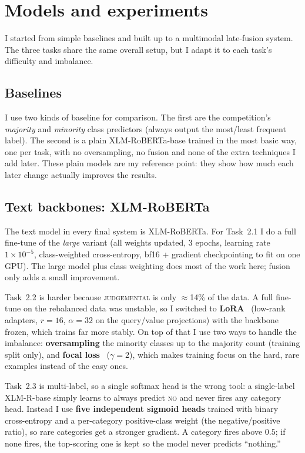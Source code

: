 \documentclass[11pt,a4paper]{article}
\begin{document}
\section{Models and experiments}
I started from simple baselines and built up to a multimodal late-fusion system. The three tasks
share the same overall setup, but I adapt it to each task's difficulty and imbalance.

\subsection{Baselines}
I use two kinds of baseline for comparison. The first are the competition's \emph{majority} and
\emph{minority} class predictors (always output the most/least frequent label). The second is a
plain XLM-RoBERTa-base trained in the most basic way, one per task, with no oversampling,
no fusion and none of the extra techniques I add later. These plain models are my reference point:
they show how much each later change actually improves the results.

\subsection{Text backbones: XLM-RoBERTa}
The text model in every final system is XLM-RoBERTa. For Task~2.1 I do a full fine-tune of the
\emph{large} variant (all weights updated, 3 epochs, learning rate $1\!\times\!10^{-5}$,
class-weighted cross-entropy, bf16 + gradient checkpointing to fit on one GPU). The large model
plus class weighting does most of the work here; fusion only adds a small improvement.

Task~2.2 is harder because \textsc{judgemental} is only $\approx$14\% of the data. A full
fine-tune on the rebalanced data was unstable, so I switched to \textbf{LoRA}~\cite{lora} (low-rank adapters,
$r{=}16$, $\alpha{=}32$ on the query/value projections) with the backbone frozen, which trains far
more stably. On top of that I use two ways to handle the imbalance: \textbf{oversampling} the minority
classes up to the majority count (training split only), and \textbf{focal loss}~\cite{focal} ($\gamma{=}2$),
which makes training focus on the hard, rare examples instead of the easy ones.

Task~2.3 is multi-label, so a single softmax head is the wrong tool: a single-label XLM-R-base
simply learns to always predict \textsc{no} and never fires any category head. Instead I use
\textbf{five independent sigmoid heads} trained with binary cross-entropy and a per-category
positive-class weight (the negative/positive ratio), so rare categories get a stronger gradient.
A category fires above $0.5$; if none fires, the top-scoring one is kept so the model never
predicts ``nothing.''
\end{document}
